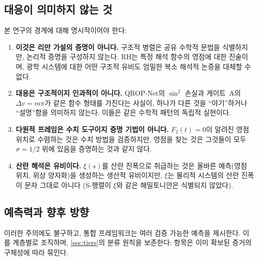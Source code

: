 \documentclass[11pt, a4paper]{article}
\theoremstyle{definition}
\theoremstyle{plain}
\newcommand{\xif}{\xi}
\begin{document}
\subsection{대응이 의미하지 않는 것}

본 연구의 경계에 대해 명시적이어야 한다:

\begin{enumerate}
  \item \textbf{이것은 리만 가설의 증명이 아니다.}
        구조적 병렬은 공유 수학적 문법을 식별하지만, 논리적 증명을 구성하지 않는다. RH는 특정 해석 함수의 영점에 대한 진술이며, 광학 시스템에 대한 어떤 구조적 유비도 엄밀한 복소 해석적 논증을 대체할 수 없다.

  \item \textbf{대응은 구조적이지 인과적이 아니다.}
        QROP-Net의 $\sin^2$ 손실과 게이트~A의 $\Delta v = m\pi$가 같은 함수 형태를 가진다는 사실이, 하나가 다른 것을 ``야기''하거나 ``설명''함을 의미하지 않는다. 이들은 같은 수학적 패턴의 독립적 실현이다.

  \item \textbf{다원적 프레임은 수치 도구이지 증명 기법이 아니다.}
        $F_2(t) = 0$이 알려진 영점 위치로 수렴하는 것은 수치 방법을 검증하지만, 영점을 찾는 것은 그것들이 모두 $\sigma = 1/2$ 위에 있음을 증명하는 것과 같지 않다.

  \item \textbf{산란 해석은 유비이다.}
        $\xif(s)$를 산란 진폭으로 취급하는 것은 올바른 예측(영점 위치, 위상 양자화)을 생성하는 생산적 유비이지만, $\xif$는 물리적 시스템의 산란 진폭이 문자 그대로 아니다 (S-행렬이 $\xif$와 같은 해밀토니안은 식별되지 않았다).
\end{enumerate}


\subsection{예측력과 향후 방향}
\label{sec:open}

이러한 주의에도 불구하고, 통합 프레임워크는 여러 검증 가능한 예측을 제시한다. 이를 계층별로 조직하며, \cref{sec:tiers}의 분류 원칙을 보존한다: 항목은 이미 확보된 증거의 구체성에 따라 묶인다.
\end{document}
